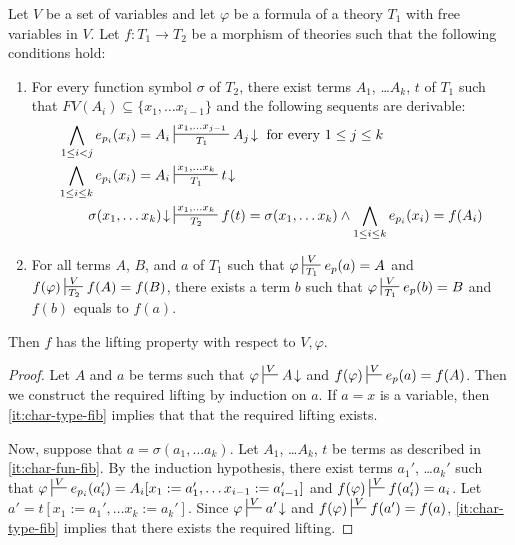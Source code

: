 \documentclass[reqno]{amsart}
\theoremstyle{definition}
\theoremstyle{remark}
\newcommand{\repl}{:=}
\numberwithin{figure}{section}
\begin{document}
\begin{lem}
Let $V$ be a set of variables and let $\varphi$ be a formula of a theory $T_1$ with free variables in $V$.
Let $f : T_1 \to T_2$ be a morphism of theories such that the following conditions hold:
\begin{enumerate}
\item \label{it:char-fun-fib} For every function symbol $\sigma$ of $T_2$, there exist terms $A_1$, \ldots $A_k$, $t$ of $T_1$ such that $FV(A_i) \subseteq \{ x_1, \ldots x_{i-1} \}$ and the following sequents are derivable:
\begin{align*}
\bigwedge_{1 \leq i < j} e_{p_i}(x_i) = A_i & \sststile{T_1}{x_1, \ldots x_{j-1}} A_j\!\downarrow \text{ for every } 1 \leq j \leq k \\
\bigwedge_{1 \leq i \leq k} e_{p_i}(x_i) = A_i & \sststile{T_1}{x_1, \ldots x_k} t\!\downarrow \\
\sigma(x_1, \ldots x_k)\!\downarrow & \sststile{T_2}{x_1, \ldots x_k} f(t) = \sigma(x_1, \ldots x_k) \land \bigwedge_{1 \leq i \leq k} e_{p_i}(x_i) = f(A_i)
\end{align*}
\item \label{it:char-type-fib} For all terms $A$, $B$, and $a$ of $T_1$ such that $\varphi \sststile{T_1}{V} e_p(a) = A$ and $f(\varphi) \sststile{T_2}{V} f(A) = f(B)$,
there exists a term $b$ such that $\varphi \sststile{T_1}{V} e_p(b) = B$ and $f(b)$ equals to $f(a)$.
\end{enumerate}
Then $f$ has the lifting property with respect to $V,\varphi$.
\end{lem}
\begin{proof}
Let $A$ and $a$ be terms such that $\varphi \sststile{}{V} A\!\downarrow$ and $f(\varphi) \sststile{}{V} e_p(a) = f(A)$.
Then we construct the required lifting by induction on $a$.
If $a = x$ is a variable, then \eqref{it:char-type-fib} implies that that the required lifting exists.

Now, suppose that $a = \sigma(a_1, \ldots a_k)$.
Let $A_1$, \ldots $A_k$, $t$ be terms as described in \eqref{it:char-fun-fib}.
By the induction hypothesis, there exist terms $a_1'$, \ldots $a_k'$ such that $\varphi \sststile{}{V} e_{p_i}(a_i') = A_i[x_1 \repl a_1', \ldots x_{i-1} \repl a_{i-1}']$ and $f(\varphi) \sststile{}{V} f(a_i') = a_i$.
Let $a' = t[x_1 \repl a_1', \ldots x_k \repl a_k']$.
Since $\varphi \sststile{}{V} a'\!\downarrow$ and $f(\varphi) \sststile{}{V} f(a') = f(a)$, \eqref{it:char-type-fib} implies that there exists the required lifting.
\end{proof}
\end{document}
